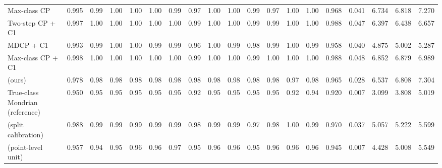 \begin{table}[!htbp]
{\begin{tabular}{lcccccccccccccccccc}
Max-class CP & 0.995 & 0.99 & 1.00 & 1.00 & 1.00 & 0.99 & 0.97 & 1.00 & 1.00 & 0.99 & 0.97 & 1.00 & 1.00 & 0.968 & 0.041 & 6.734 & 6.818 & 7.270 \\
Two-step CP + C1 & 0.997 & 1.00 & 1.00 & 1.00 & 1.00 & 1.00 & 0.99 & 1.00 & 1.00 & 0.99 & 0.99 & 1.00 & 1.00 & 0.988 & 0.047 & 6.397 & 6.438 & 6.657 \\
MDCP + C1 & 0.993 & 0.99 & 1.00 & 1.00 & 0.99 & 0.99 & 0.96 & 1.00 & 0.99 & 0.98 & 0.99 & 1.00 & 0.99 & 0.958 & 0.040 & 4.875 & 5.002 & 5.287 \\
Max-class CP + C1 & 0.998 & 1.00 & 1.00 & 1.00 & 1.00 & 1.00 & 0.99 & 1.00 & 1.00 & 0.99 & 1.00 & 1.00 & 1.00 & 0.988 & 0.048 & 6.852 & 6.879 & 6.989 \\
\gamut{} (ours) & 0.978 & 0.98 & 0.98 & 0.98 & 0.98 & 0.98 & 0.98 & 0.98 & 0.98 & 0.98 & 0.98 & 0.97 & 0.98 & 0.965 & 0.028 & 6.537 & 6.808 & 7.304 \\
True-class Mondrian (reference) & 0.950 & 0.95 & 0.95 & 0.95 & 0.95 & 0.95 & 0.92 & 0.95 & 0.95 & 0.95 & 0.95 & 0.92 & 0.94 & 0.920 & 0.007 & 3.099 & 3.808 & 5.019 \\
\gamut{} (split calibration) & 0.988 & 0.99 & 0.99 & 0.99 & 0.99 & 0.99 & 0.98 & 0.99 & 0.99 & 0.97 & 0.98 & 1.00 & 0.99 & 0.970 & 0.037 & 5.057 & 5.222 & 5.599 \\
\gamut{} (point-level unit) & 0.957 & 0.94 & 0.95 & 0.96 & 0.96 & 0.97 & 0.95 & 0.96 & 0.96 & 0.95 & 0.96 & 0.96 & 0.96 & 0.945 & 0.007 & 4.428 & 5.008 & 5.549 \\
\bottomrule
\end{tabular}}
\end{table}

